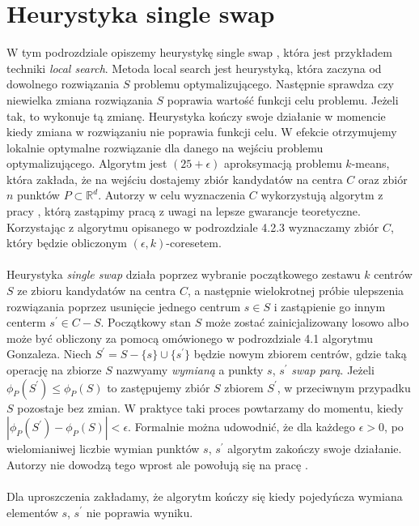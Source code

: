 \section{Heurystyka single swap}

W tym podrozdziale opiszemy heurystykę single swap \cite{Arya2004LocalSH}, która jest przykładem techniki \textit{local search}.
Metoda local search jest heurystyką, która zaczyna od dowolnego rozwiązania $S$ problemu optymalizującego.
Następnie sprawdza czy niewielka zmiana rozwiązania $S$ poprawia wartość funkcji celu problemu.
Jeżeli tak, to wykonuje tą zmianę.
Heurystyka kończy swoje działanie w momencie kiedy zmiana w rozwiązaniu nie poprawia funkcji celu.
W efekcie otrzymujemy lokalnie optymalne rozwiązanie dla danego na wejściu problemu optymalizującego.
Algorytm jest $(25 + \epsilon)$ aproksymacją problemu $k$-means, która zakłada, że na wejściu dostajemy zbiór kandydatów na centra $C$ oraz zbiór $n$ punktów $P \subset \mathbb{R}^d$.
Autorzy \cite{Arya2004LocalSH} w celu wyznaczenia $C$ wykorzystują algorytm z pracy \cite{Matousek99onapproximate}, którą zastąpimy pracą \cite{10.1145/1007352.1007400} z uwagi na lepsze gwarancje teoretyczne.
Korzystając z algorytmu opisanego w podrozdziale 4.2.3 wyznaczamy zbiór $C$, który będzie obliczonym $(\epsilon, k)$-coresetem.
\\~\\
Heurystyka \textit{single swap} działa poprzez wybranie początkowego zestawu $k$ centrów $S$ ze zbioru kandydatów na centra $C$, a następnie wielokrotnej
próbie ulepszenia rozwiązania poprzez usunięcie jednego centrum $s \in S$ i zastąpienie go innym centerm $s^{'} \in C - S$.
Początkowy stan $S$ może zostać zainicjalizowany losowo albo może być obliczony za pomocą omówionego w podrozdziale 4.1 algorytmu Gonzaleza.
Niech $S^{'} = S - \{s\} \cup \{s^{'}\}$ będzie nowym zbiorem centrów, gdzie taką operację na zbiorze $S$ nazwyamy \textit{wymianą} a punkty $s$, $s^{'}$ \textit{swap parą}.
Jeżeli $\phi_{P}(S^{'}) \leq \phi_{P}(S)$ to zastępujemy zbiór $S$ zbiorem $S^{'}$, w przeciwnym przypadku $S$ pozostaje bez zmian.
W praktyce taki proces powtarzamy do momentu, kiedy $|\phi_{P}(S^{'}) - \phi_{P}(S) | < \epsilon$.
Formalnie można udowodnić, że dla każdego $\epsilon > 0$, po wielomianiwej liczbie wymian punktów $s$, $s^{'}$ algorytm zakończy swoje działanie.
Autorzy nie dowodzą tego wprost ale powołują się na pracę \cite{10.1145/380752.380755}.
\\~\\
Dla uproszczenia zakładamy, że algorytm kończy się kiedy pojedyńcza wymiana elementów $s$, $s^{'}$ nie poprawia wyniku.
